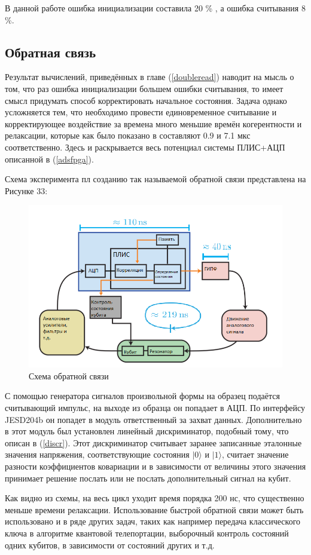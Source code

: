 В данной работе ошибка инициализации составила 20 \% , а ошибка считывания 8 \%.
\subsection{Обратная связь}
Результат вычислений, приведённых в главе (\ref{doubleread}) наводит на мысль о том, что раз ошибка инициализации большем ошибки считывания, то имеет смысл придумать способ корректировать начальное состояния. Задача однако усложняется тем, что необходимо провести единовременное считывание и корректирующее воздействие за времена много меньшие времён когерентности и релаксации, которые как было показано в составляют 0.9 и 7.1 мкс соответственно. Здесь и раскрывается весь потенциал системы ПЛИС+АЦП описанной в (\ref{adsfpga}). 

Схема эксперимента пл созданию так называемой обратной связи представлена на Рисунке 33:
\begin{figure}[h]
	\centering
	\includegraphics[width=0.7\linewidth]{pictures/feedback}
	\caption{Схема обратной связи}
	\label{fig:feedback}
\end{figure}

С помощью генератора сигналов произвольной формы на образец подаётся считывающий импульс, на выходе из образца он попадает в АЦП. По интерфейсу JESD204b он попадет в модуль ответственный за захват данных. Дополнительно в этот модуль был установлен линейный дискриминатор, подобный тому, что описан в (\ref{discr}). Этот дискриминатор считывает заранее записанные эталонные значения напряжения, соответствующие состояния $|0\rangle$ и $|1\rangle$, считает значение разности коэффициентов ковариации и в зависимости от величины этого значения принимает решение послать или не послать дополнительный сигнал на кубит. 

Как видно из схемы, на весь цикл уходит время порядка 200 нс, что существенно меньше времени релаксации. Использование быстрой обратной связи может быть использовано и в ряде других задач, таких как например передача классического ключа в алгоритме квантовой телепортации, выборочный контроль состояний одних кубитов, в зависимости от состояний других и т.д.



